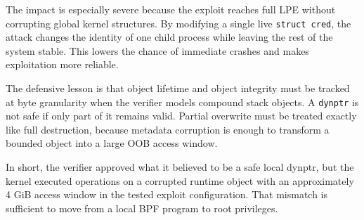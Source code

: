 \documentclass[../main.tex]{subfiles}
\begin{document}
The impact is especially severe because the exploit reaches full LPE without corrupting global kernel structures. By modifying a single live \texttt{struct cred}, the attack changes the identity of one child process while leaving the rest of the system stable. This lowers the chance of immediate crashes and makes exploitation more reliable.

The defensive lesson is that object lifetime and object integrity must be tracked at byte granularity when the verifier models compound stack objects. A \texttt{dynptr} is not safe if only part of it remains valid. Partial overwrite must be treated exactly like full destruction, because metadata corruption is enough to transform a bounded object into a large OOB access window.

In short, the verifier approved what it believed to be a safe local dynptr, but the kernel executed operations on a corrupted runtime object with an approximately 4 GiB access window in the tested exploit configuration. That mismatch is sufficient to move from a local BPF program to root privileges.
\end{document}
